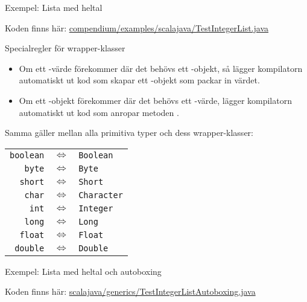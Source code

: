 \begin{Slide}{Exempel: Lista med heltal}

\scriptsize Koden finns här: \href{https://github.com/lunduniversity/introprog/tree/master/compendium/examples/scalajava/generics/TestIntegerList.java}{compendium/examples/scalajava/TestIntegerList.java}
\end{Slide}

\begin{Slide}{Specialregler för wrapper-klasser}\footnotesize
\begin{itemize}
\item Om ett -värde förekommer där det behövs ett -objekt, så lägger kompilatorn automatiskt ut kod som skapar ett -objekt som packar in värdet.
\item Om ett -objekt förekommer där det behövs ett -värde, lägger kompilatorn automatiskt ut kod som anropar metoden .
\end{itemize}
Samma gäller mellan alla primitiva typer och dess wrapper-klasser: 
\begin{table}
\center
\begin{tabular}{r c l}
 {\lstinline!boolean!} &$\Leftrightarrow$& {\lstinline!Boolean!} \\
 {\lstinline!byte!} &$\Leftrightarrow$& {\lstinline!Byte!}\\
 {\lstinline!short!}&$\Leftrightarrow$& {\lstinline!Short!}\\
 {\lstinline!char!} &$\Leftrightarrow$& {\lstinline!Character!}\\
 {\lstinline!int!} &$\Leftrightarrow$& {\lstinline!Integer!}\\
 {\lstinline!long!} &$\Leftrightarrow$& {\lstinline!Long!}\\
 {\lstinline!float!} &$\Leftrightarrow$& {\lstinline!Float!}\\
 {\lstinline!double!} &$\Leftrightarrow$&{\lstinline!Double!}\\
\end{tabular}
\end{table}
\end{Slide}

\begin{Slide}{Exempel: Lista med heltal och autoboxing}

\scriptsize Koden finns här: \href{https://github.com/lunduniversity/introprog/tree/master/compendium/examples/scalajava/generics/TestIntegerList.java}{scalajava/generics/TestIntegerListAutoboxing.java}
\end{Slide}

